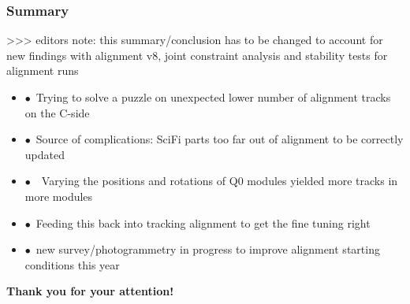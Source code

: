 \documentclass[aspectratio=1610, 12pt, xcolor=dvipsnames]{beamer}
\begin{document}
\begin{frame}\frametitle{Summary}
  >>> editors note: this summary/conclusion has to be changed to account for new findings with alignment v8, 
  joint constraint analysis and stability tests for alignment runs
  \begin{itemize}
    \item $\bullet$\, Trying to solve a puzzle on unexpected lower number of alignment tracks on the C-side
    \item $\bullet$\, Source of complications: SciFi parts too far out of alignment to be correctly updated
    \item $\bullet$\, \to\, Varying the positions and rotations of Q0 modules yielded more tracks in more modules
    \item $\bullet$\, Feeding this back into tracking alignment to get the fine tuning right
    \item $\bullet$\, new survey/photogrammetry in progress to improve alignment starting conditions this year
  \end{itemize}
  \textbf{Thank you for your attention!}
\end{frame}

%  


\end{document}
